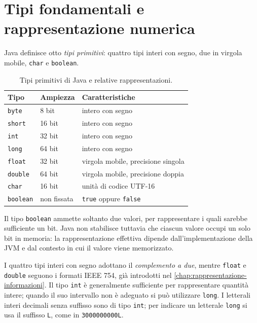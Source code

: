 \clearpage

\section{Tipi fondamentali e rappresentazione numerica}
\label{sec:fi-java-tipi-fondamentali}

Java definisce otto \emph{tipi primitivi}: quattro tipi interi
con segno, due in virgola mobile, \texttt{char} e
\texttt{boolean}.

\begin{table}[htbp]
  \centering
  \begin{tabular}{lll}
    \hline
    Tipo & Ampiezza & Caratteristiche \\
    \hline
    \texttt{byte} & 8 bit & intero con segno \\
    \texttt{short} & 16 bit & intero con segno \\
    \texttt{int} & 32 bit & intero con segno \\
    \texttt{long} & 64 bit & intero con segno \\
    \texttt{float} & 32 bit & virgola mobile, precisione singola \\
    \texttt{double} & 64 bit & virgola mobile, precisione doppia \\
    \texttt{char} & 16 bit & unità di codice UTF-16 \\
    \texttt{boolean} & non fissata & \texttt{true} oppure \texttt{false} \\
    \hline
  \end{tabular}
  \caption{Tipi primitivi di Java e relative rappresentazioni.}
  \label{tab:fi-java-tipi-primitivi}
\end{table}

Il tipo \texttt{boolean} ammette soltanto due valori, per
rappresentare i quali sarebbe sufficiente un bit. Java non
stabilisce tuttavia che ciascun valore occupi un solo bit
in memoria: la rappresentazione effettiva dipende
dall'implementazione della JVM e dal contesto in cui il
valore viene memorizzato.

I quattro tipi interi con segno adottano il
\emph{complemento a due}, mentre \texttt{float} e
\texttt{double} seguono i formati IEEE 754, già introdotti
nel \cref{chap:rappresentazione-informazioni}.
Il tipo \texttt{int} è generalmente sufficiente per
rappresentare quantità intere; quando il suo intervallo
non è adeguato si può utilizzare \texttt{long}. I letterali
interi decimali senza suffisso sono di tipo \texttt{int};
per indicare un letterale \texttt{long} si usa il suffisso
\texttt{L}, come in \texttt{3000000000L}.

